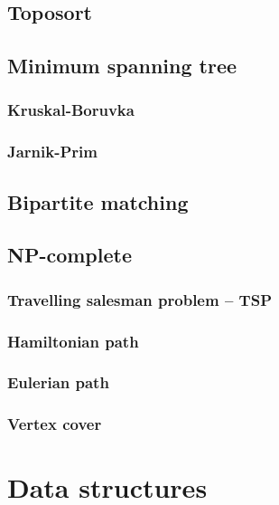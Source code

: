 \documentclass[a4paper]{article}
\begin{document}
\begin{multicols*}{3}
    \subsection{Toposort}
        
    \subsection{Minimum spanning tree}
        \subsubsection{Kruskal-Boruvka}
            
        \subsubsection{Jarnik-Prim}
            
    \subsection{Bipartite matching}
        
    \subsection{NP-complete}
        \subsubsection{Travelling salesman problem -- TSP}
            
        \subsubsection{Hamiltonian path}
            
        \subsubsection{Eulerian path}
            
        \subsubsection{Vertex cover}
            

\section{Data structures}

\end{multicols*}
\end{document}
